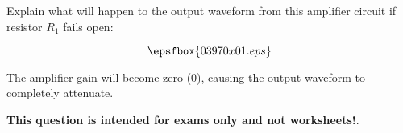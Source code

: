 

Explain what will happen to the output waveform from this amplifier circuit if resistor $R_1$ fails open:

$$\epsfbox{03970x01.eps}$$







The amplifier gain will become zero (0), causing the output waveform to completely attenuate.







{\bf This question is intended for exams only and not worksheets!}.



